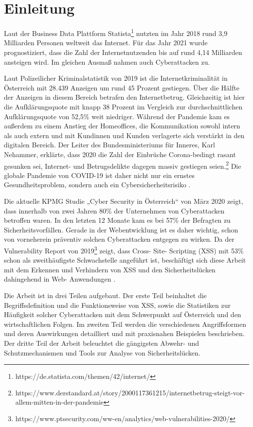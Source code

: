 \section{Einleitung}
\label{section:Einleitung}

Laut der Business Data Plattform Statista\footnote{https://de.statista.com/themen/42/internet/} nutzten im Jahr 2018 rund 3,9 Milliarden Personen weltweit das Internet. Für das Jahr 2021 wurde prognostiziert, dass die Zahl der Internetnutzenden bis auf rund 4,14 Milliarden ansteigen wird. Im gleichen Ausmaß nahmen auch Cyberattacken zu.

Laut Polizeilicher Kriminalstatistik von 2019 ist die Internetkriminalität in Österreich mit 28.439 Anzeigen um rund 45 Prozent gestiegen. Über die Hälfte der Anzeigen in diesem Bereich betrafen den Internetbetrug. Gleichzeitig ist hier die Aufklärungsquote mit knapp 38 Prozent im Vergleich zur durchschnittlichen Aufklärungsquote von 52,5\% weit niedriger. Während der Pandemie kam es außerdem zu einem Anstieg der Homeoffices, die Kommunikation sowohl intern als auch extern und mit Kundinnen und Kunden verlagerte sich verstärkt in den digitalen Bereich.  Der Leiter des Bundesministeriums für Inneres, Karl Nehammer, erklärte, dass 2020 die Zahl der Einbrüche Corona-bedingt rasant gesunken sei, Internet- und Betrugsdelikte dagegen massiv gestiegen seien.\footnote{https://www.derstandard.at/story/2000117361215/internetbetrug-steigt-vor-allem-mitten-in-der-pandemie}
Die globale Pandemie von COVID-19 ist daher nicht nur ein ernstes Gesundheitsproblem, sondern auch ein Cybersicherheitsrisiko \autocite[12-17]{bundeskriminalamt2020}.

Die aktuelle KPMG Studie „Cyber Security in Österreich“ von März 2020 zeigt, dass innerhalb von zwei Jahren 80\% der Unternehmen von Cyberattacken betroffen waren. In den letzten 12 Monate kam es bei 57\% der Befragten zu Sicherheitsvorfällen. Gerade in der Webentwicklung ist es daher wichtig, schon von vorneherein präventiv solchen Cyberattacken entgegen zu wirken. Da der Vulnerability Report von 2019\footnote{https://www.ptsecurity.com/ww-en/analytics/web-vulnerabilities-2020/} zeigt, dass Cross- Site- Scripting (XSS) mit 53\% schon als zweithäufigste Schwachstelle angeführt ist, beschäftigt sich diese Arbeit mit dem Erkennen und Verhindern von XSS und den Sicherheitslücken dahingehend in Web- Anwendungen \autocite[10-13]{kpmg2020}.

Die Arbeit ist in drei Teilen aufgebaut. Der erste Teil beinhaltet die Begriffsdefinition und die Funktionsweise von XSS, sowie die Statistiken zur Häufigkeit solcher Cyberattacken mit dem Schwerpunkt auf Österreich und den wirtschaftlichen Folgen. Im zweiten Teil werden die verschiedenen Angriffsformen und deren Auswirkungen detailliert und mit praxisnahen Beispielen beschrieben. Der dritte Teil der Arbeit beleuchtet die gängigsten Abwehr- und Schutzmechanismen und Tools zur Analyse von Sicherheitslücken.


